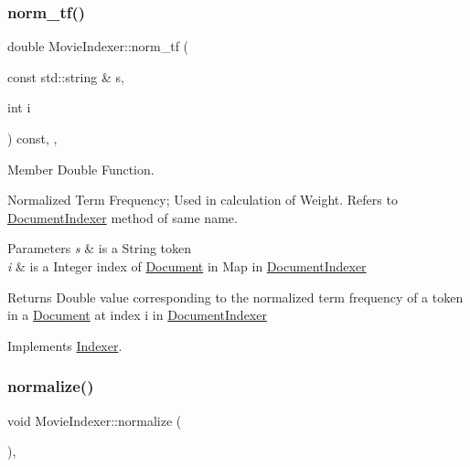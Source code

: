 \mbox{\label{class_movie_indexer_a1ea55cde00e7a8be06eedcff56021de2}} 
\subsubsection{\texorpdfstring{norm\+\_\+tf()}{norm\_tf()}}
{\footnotesize\ttfamily double Movie\+Indexer\+::norm\+\_\+tf (\begin{DoxyParamCaption}\item[{const std\+::string \&}]{s,  }\item[{int}]{i }\end{DoxyParamCaption}) const\hspace{0.3cm}{\ttfamily [override]}, {\ttfamily [private]}, {\ttfamily [virtual]}}



Member Double Function. 

Normalized Term Frequency; Used in calculation of Weight. Refers to \hyperlink{class_document_indexer}{Document\+Indexer} method of same name.


\begin{DoxyParams}{Parameters}
{\em s} & is a String token \\
\hline
{\em i} & is a Integer index of \hyperlink{class_document}{Document} in Map in \hyperlink{class_document_indexer}{Document\+Indexer} \\
\hline
\end{DoxyParams}
\begin{DoxyReturn}{Returns}
Double value corresponding to the normalized term frequency of a token in a \hyperlink{class_document}{Document} at index i in \hyperlink{class_document_indexer}{Document\+Indexer} 
\end{DoxyReturn}


Implements \hyperlink{class_indexer_aadcdca40938d27c465e564ac8852f02d}{Indexer}.

\mbox{\label{class_movie_indexer_a87d8a0a6c117e3cbc9f5872889b9ed6d}} 
\subsubsection{\texorpdfstring{normalize()}{normalize()}}
{\footnotesize\ttfamily void Movie\+Indexer\+::normalize (\begin{DoxyParamCaption}{ }\end{DoxyParamCaption})\hspace{0.3cm}{\ttfamily [override]}, {\ttfamily [virtual]}}



